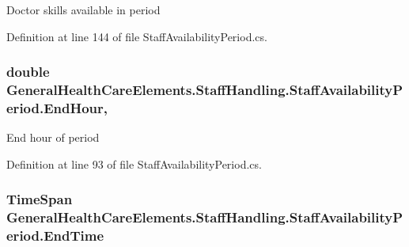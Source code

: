 Doctor skills available in period 



Definition at line 144 of file Staff\+Availability\+Period.\+cs.

\subsubsection[{\texorpdfstring{End\+Hour}{EndHour}}]{\setlength{\rightskip}{0pt plus 5cm}double General\+Health\+Care\+Elements.\+Staff\+Handling.\+Staff\+Availability\+Period.\+End\+Hour\hspace{0.3cm}{\ttfamily [get]}, {\ttfamily [set]}}\hypertarget{class_general_health_care_elements_1_1_staff_handling_1_1_staff_availability_period_aca76853a174200531da0f3de0783109c}{}\label{class_general_health_care_elements_1_1_staff_handling_1_1_staff_availability_period_aca76853a174200531da0f3de0783109c}


End hour of period 



Definition at line 93 of file Staff\+Availability\+Period.\+cs.

\subsubsection[{\texorpdfstring{End\+Time}{EndTime}}]{\setlength{\rightskip}{0pt plus 5cm}Time\+Span General\+Health\+Care\+Elements.\+Staff\+Handling.\+Staff\+Availability\+Period.\+End\+Time\hspace{0.3cm}{\ttfamily [get]}}\hypertarget{class_general_health_care_elements_1_1_staff_handling_1_1_staff_availability_period_a9ebd6b22f0d21e837c2fe9d594a30018}{}\label{class_general_health_care_elements_1_1_staff_handling_1_1_staff_availability_period_a9ebd6b22f0d21e837c2fe9d594a30018}


